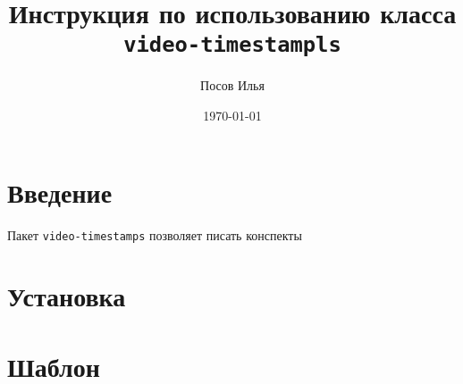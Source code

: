 \documentclass{article}
\title{Инструкция по использованию класса \texttt{video-timestampls}}
\author{Посов Илья}
\date{\today}
\begin{document}
    \maketitle
    \section{Введение}
    Пакет \texttt{video-timestamps} позволяет писать конспекты
    \section{Установка}
    \section{Шаблон}
\end{document}
